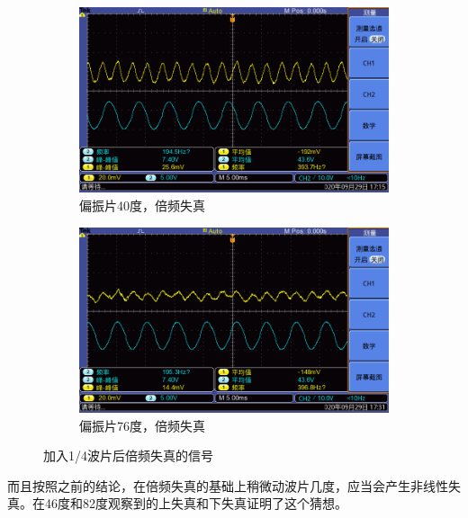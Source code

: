 \documentclass{ctexart}
\begin{document}
\begin{figure}[H]
  \centering
  \begin{subfigure}{.48\textwidth}
    \centering
    \includegraphics[width=\linewidth]{晶体电光调制图像/有波片/倍频失真484V40度/F0002TEK}
    \caption{偏振片40度，倍频失真}
  \end{subfigure}
  \begin{subfigure}{.48\textwidth}
    \centering
    \includegraphics[width=\linewidth]{晶体电光调制图像/有波片/倍频失真484V76度/F0000TEK}
    \caption{偏振片76度，倍频失真}
  \end{subfigure}
  \caption{加入1/4波片后倍频失真的信号}
\end{figure}

而且按照之前的结论，在倍频失真的基础上稍微动波片几度，应当会产生非线性失真。在46度和82度观察到的上失真和下失真证明了这个猜想。
\end{document}
